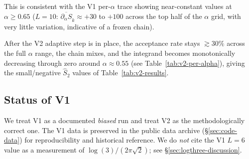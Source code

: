 \documentclass[11pt,a4paper]{article}
\theoremstyle{definition}
\begin{document}
This is consistent with the V1 per-$\alpha$ trace showing
near-constant values at $\alpha \ge 0.65$ ($L = 10$:
$\overline{\partial_\alpha S}_k \approx +30$ to $+100$ across the
top half of the $\alpha$ grid, with very little variation,
indicative of a frozen chain).

After the V2 adaptive step is in place, the acceptance rate stays
$\gtrsim 30\%$ across the full $\alpha$ range, the chain mixes, and
the integrand becomes monotonically decreasing through zero around
$\alpha \approx 0.55$ (see Table~\ref{tab:v2-per-alpha}), giving the
small/negative $\widehat S_2$ values of
Table~\ref{tab:v2-results}.

\subsection{Status of V1}

We treat V1 as a documented \emph{biased} run and treat V2 as the
methodologically correct one. The V1 data is preserved in the public
data archive (\S\ref{sec:code-data}) for reproducibility and
historical reference. We do \emph{not} cite the V1 $L = 6$ value as
a measurement of $\log(3)/(2\pi\sqrt 2)$; see
\S\ref{sec:logthree-discussion}.
\end{document}
